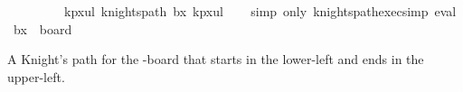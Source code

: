 \begin{isabellebody}
\ \ {\isacharbrackleft}{\kern0pt}{}{}{\isacharcomma}{\kern0pt}{}{\isacharcomma}{\kern0pt}{}{}{\isacharcomma}{\kern0pt}{}{}{\isacharcomma}{\kern0pt}{}{}{\isacharcomma}{\kern0pt}{}{}{\isacharcomma}{\kern0pt}{}{}{\isacharbrackright}{\kern0pt}{\isacharcomma}{\kern0pt}\isanewline
\ \ {\isacharbrackleft}{\kern0pt}{}{}{\isacharcomma}{\kern0pt}{}{}{\isacharcomma}{\kern0pt}{}{}{\isacharcomma}{\kern0pt}{}{}{\isacharcomma}{\kern0pt}{}{}{\isacharcomma}{\kern0pt}{}{}{\isacharcomma}{\kern0pt}{}{}{\isacharbrackright}{\kern0pt}{\isacharcomma}{\kern0pt}\isanewline
\ \ {\isacharbrackleft}{\kern0pt}{}{\isacharcomma}{\kern0pt}{}{}{\isacharcomma}{\kern0pt}{}{}{\isacharcomma}{\kern0pt}{}{}{\isacharcomma}{\kern0pt}{}{}{\isacharcomma}{\kern0pt}{}{}{\isacharcomma}{\kern0pt}{}{}{\isacharbrackright}{\kern0pt}{\isacharbrackright}{\kern0pt}{\isacharparenright}{\kern0pt}{\isachardoublequoteclose}\isanewline
{}\isamarkupfalse%
\ kp{\isacharunderscore}{\kern0pt}{}x{}{\isacharunderscore}{\kern0pt}ul{\isacharcolon}{\kern0pt}\ {\isachardoublequoteopen}knights{\isacharunderscore}{\kern0pt}path\ b{}x{}\ kp{}x{}ul{\isachardoublequoteclose}\isanewline
%
\isadelimproof
\ \ %
\endisadelimproof
%
\isatagproof
{}\isamarkupfalse%
\ {\isacharparenleft}{\kern0pt}simp\ only{\isacharcolon}{\kern0pt}\ knights{\isacharunderscore}{\kern0pt}path{\isacharunderscore}{\kern0pt}exec{\isacharunderscore}{\kern0pt}simp{\isacharparenright}{\kern0pt}\ eval%
\endisatagproof
{\isafoldproof}%
%
\isadelimproof
\isanewline
%
\endisadelimproof
\isanewline
{}\isamarkupfalse%
\ {\isachardoublequoteopen}b{}x{}\ {\isasymequiv}\ board\ {}\ {}{\isachardoublequoteclose}%
\begin{isamarkuptext}%
A Knight's path for the -board that starts in the lower-left and ends in the 
upper-left.
  \begin{table}[H]
    \begin{tabular}{lllllllll}

\end{tabular}
\end{table}
\end{isamarkuptext}
\end{isabellebody}
